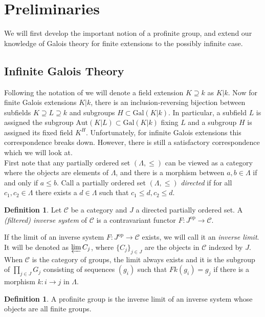 \documentclass{article}
\theoremstyle{definition}
\newtheorem{definition}[theorem]{Definition}
\theoremstyle{remark}
\newcommand{\mc}[1]{\mathcal{#1}}
\begin{document}
\section{Preliminaries}
We will first develop the important notion of a profinite group, and extend our knowledge of Galois theory for finite extensions to the possibly infinite case.

\subsection{Infinite Galois Theory}

Following the notation of \cite{Szamuely} we will denote a field extension $K \supseteq k$ as $K|k$. 
Now for finite Galois extensions $K|k$, there is an inclusion-reversing bijection between subfields $K \supseteq L \supseteq k$ and subgroups $H \subset \text{Gal}(K|k)$.
In particular, a subfield $L$ is assigned the subgroup $\text{Aut}(K|L) \subset \text{Gal}(K|k)$ fixing $L$ and a subgroup $H$ is assigned its fixed field $K^H$.
Unfortunately, for infinite Galois extensions this correspondence breaks down.
However, there is still a satisfactory correspondence which we will look at.\\

First note that any partially ordered set $(\Lambda, \leq)$ can be viewed as a category where the objects are elements of $\Lambda$, and there is a morphism between $a,b \in \Lambda$ if and only if $a \leq b$.
Call a partially ordered set $(\Lambda, \leq)$ \textit{directed} if for all $c_1, c_2 \in \Lambda$ there exists a $d \in \Lambda$ such that $c_1 \leq d, c_2 \leq d$.

\begin{definition}
	Let $\mc{C}$ be a category and $J$ a directed partially ordered set. A \textit{(filtered) inverse system} of $\mc{C}$ is a contravariant functor $F: J^{\text{op}} \to \mc{C}$.
\end{definition}

If the limit of an inverse system $F: J^{\text{op}} \to \mc{C}$ exists, we will call it an \textit{inverse limit}.
It will be denoted as $\varprojlim C_{j}$, where $\{C_j\}_{j \in J}$ are the objects in $\mc{C}$ indexed by $J$.
When $\mc{C}$ is the category of groups, the limit always exists and it is the subgroup of $\prod_{j \in J} G_j$ consisting of sequences $(g_i)$ such that $Fk(g_i) = g_j$ if there is a morphism $k: i  \to j$ in $\Lambda$.

\begin{definition}
	A profinite group is the inverse limit of an inverse system whose objects are all finite groups.
\end{definition}
\end{document}
